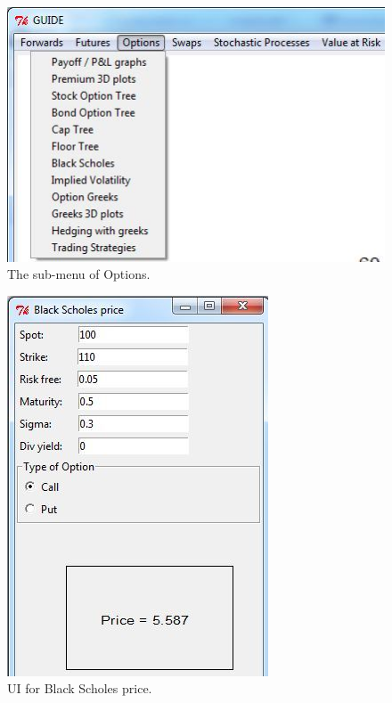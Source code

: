\documentclass{article}
\begin{document}
\begin{figure}
\centering
\includegraphics[width=1\textwidth]{op-menu.jpg}
\caption{The sub-menu of Options.} 
\label{Fig:opmenu}
\end{figure}


\begin{figure}
\centering
\includegraphics{bs2.jpg}
\caption[]{UI for Black Scholes price.}
\label{Fig:calcbs}
\end{figure}
\end{document}
